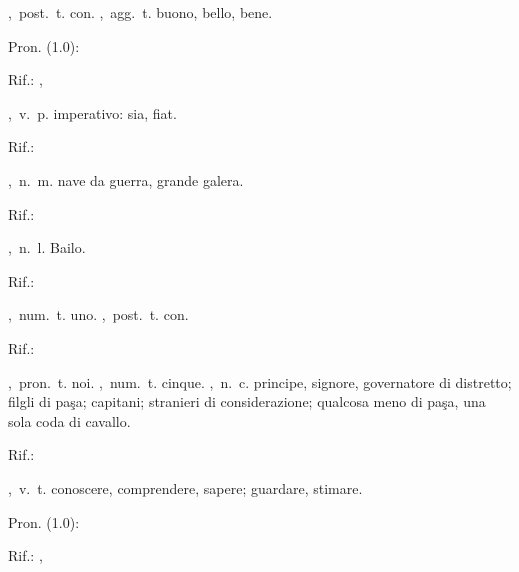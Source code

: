 ,\ post.\ t.
con.
,\ agg.\ t.
buono, bello, bene.
\begin{subvocedue}
\item[Pron. (1.0):] 
\item[Rif.:] , 
\end{subvocedue}
,\ v.\ p.
imperativo: sia, fiat.
\begin{subvocedue}
\item[Rif.:] 
\end{subvocedue}
,\ n.\ m.
nave da guerra, grande galera.
\begin{subvocedue}
\item[Rif.:] 
\end{subvocedue}
,\ n.\ l.
Bailo.
\begin{subvocedue}
\item[Rif.:] 
\end{subvocedue}
,\ num.\ t.
uno.
,\ post.\ t.
con.
\begin{subvocedue}
\item[Rif.:] 
\end{subvocedue}
,\ pron.\ t.
noi.
,\ num.\ t.
cinque.
,\ n.\ c.
principe, signore, governatore di distretto; filgli di paşa; capitani; stranieri di considerazione; qualcosa meno di paşa, una sola coda di cavallo.
\begin{subvocedue}
\item[Rif.:] 
\end{subvocedue}
,\ v.\ t.
conoscere, comprendere, sapere; guardare, stimare.
\begin{subvocedue}
\item[Pron. (1.0):] 
\item[Rif.:] , 
\end{subvocedue}
